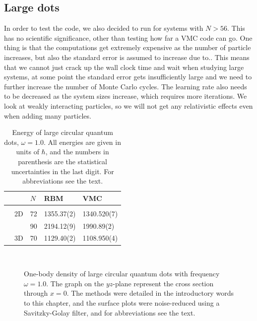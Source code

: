 \newpage
\subsection{Large dots}
In order to test the code, we also decided to run for systems with $N>56$. This has no scientific significance, other than testing how far a VMC code can go. One thing is that the computations get extremely expensive as the number of particle increases, but also the standard error is assumed to increase due to.. This means that we cannot just crack up the wall clock time and wait when studying large systems, at some point the standard error gets insufficiently large and we need to further increase the number of Monte Carlo cycles. The learning rate also needs to be decreased as the system sizes increase, which requires more iterations.  We look at weakly interacting particles, so we will not get any relativistic effects even when adding many particles.

\begin{table}[H]
	\caption{Energy of large circular quantum dots, $\omega=1.0$. All energies are given in units of $\hbar$, and the numbers in parenthesis are the statistical uncertainties in the last digit. For abbreviations see the text.}
	\label{tab:largeQD}
	\begin{tabularx}{\textwidth}{R{1.6cm}R{2cm}R{2cm}R{3cm}R{3cm}} \hline\hline
		& \makecell{\\ \phantom{$N$}} & $N$ & RBM & VMC \\ \hline \\
		& 2D & 72 & 1355.37(2) & 1340.520(7) \\
		&& 90 & 2194.12(9) & 1990.89(2) \\
		& 3D & 70 & 1129.40(2) & 1108.950(4) \\
		\hline \hline
	\end{tabularx}
\end{table}

\begin{figure}[H]
	\centering
	\captionsetup[subfigure]{labelformat=empty}
	\\
	\caption{One-body density of large circular quantum dots with frequency $\omega=1.0$. The graph on the $yz$-plane represent the cross section through $x=0$. The methods were detailed in the introductory words to this chapter, and the surface plots were noise-reduced using a Savitzky-Golay filter, and for abbreviations see the text.}
	\label{fig:largedotsOB}
\end{figure}

